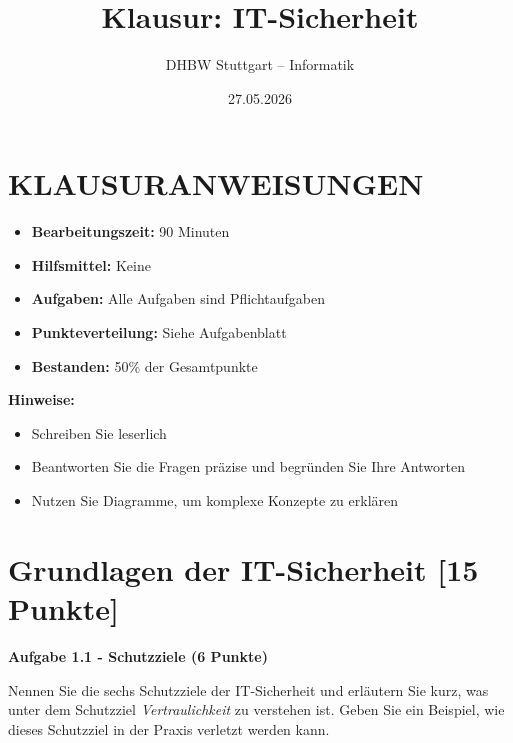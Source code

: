 \documentclass[12pt,a4paper]{article}
\title{\textbf{Klausur: IT-Sicherheit}}
\author{DHBW Stuttgart -- Informatik}
\date{27.05.2026}
\begin{document}
\maketitle


\section*{KLAUSURANWEISUNGEN}

\begin{itemize}
    \item \textbf{Bearbeitungszeit:} 90 Minuten
    \item \textbf{Hilfsmittel:} Keine
    \item \textbf{Aufgaben:} Alle Aufgaben sind Pflichtaufgaben
    \item \textbf{Punkteverteilung:} Siehe Aufgabenblatt
    \item \textbf{Bestanden:} 50\% der Gesamtpunkte
\end{itemize}

\textbf{Hinweise:}
\begin{itemize}
    \item Schreiben Sie leserlich
    \item Beantworten Sie die Fragen präzise und begründen Sie Ihre Antworten
    \item Nutzen Sie Diagramme, um komplexe Konzepte zu erklären
\end{itemize}

\newpage


\section{Grundlagen der IT-Sicherheit [15 Punkte]}

\textbf{Aufgabe 1.1 - Schutzziele (6 Punkte)}

Nennen Sie die sechs Schutzziele der IT-Sicherheit und erläutern Sie kurz, was unter dem Schutzziel \textit{Vertraulichkeit} zu verstehen ist. Geben Sie ein Beispiel, wie dieses Schutzziel in der Praxis verletzt werden kann.

\vspace{4cm}
\end{document}
